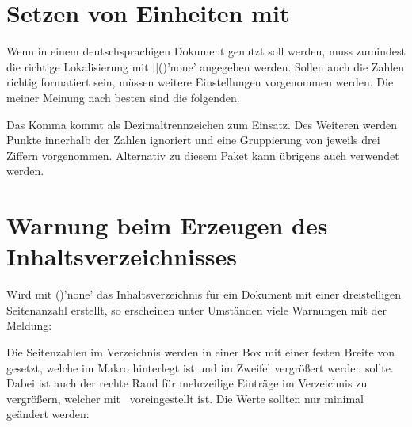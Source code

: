 \section{Setzen von Einheiten mit }
%
%
%
Wenn  in einem deutschsprachigen Dokument genutzt soll
werden, muss zumindest die richtige Lokalisierung mit
[]()'none' angegeben 
werden. Sollen auch die Zahlen richtig formatiert sein, müssen weitere 
Einstellungen vorgenommen werden. Die meiner Meinung nach besten sind die 
folgenden.
%
\begin{quoting}
\begin{Code}
\end{Code}
\end{quoting}
%
Das Komma kommt als Dezimaltrennzeichen zum Einsatz. Des Weiteren werden Punkte 
innerhalb der Zahlen ignoriert und eine Gruppierung von jeweils drei Ziffern 
vorgenommen. Alternativ zu diesem Paket kann übrigens auch  
verwendet werden.



\section{Warnung beim Erzeugen des Inhaltsverzeichnisses}
%
%
Wird mit ()'none' das 
Inhaltsverzeichnis für ein Dokument mit einer dreistelligen Seitenanzahl 
erstellt, so erscheinen unter Umständen viele Warnungen mit der Meldung:
%
\begin{quoting}
\end{quoting}
%
Die Seitenzahlen im Verzeichnis werden in einer Box mit einer festen Breite 
von~\PValue{1.55em} gesetzt, welche im Makro  hinterlegt ist 
und im Zweifel vergrößert werden sollte. Dabei ist auch der rechte Rand für 
mehrzeilige Einträge im Verzeichnis  zu vergrößern, welcher 
mit~\PValue{2.55em} voreingestellt ist. Die Werte sollten nur minimal geändert 
werden:
%
\begin{quoting}
\begin{Code}
\makeatletter
\renewcommand*{\@pnumwidth}{1.7em}\renewcommand*{\@tocrmarg}{2.7em}
\makeatother
\end{Code}
\end{quoting}



